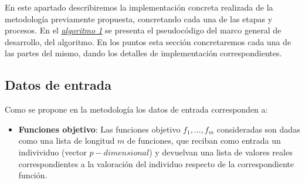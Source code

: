

\justify


En este apartado describiremos la implementación concreta realizada de la metodología previamente propuesta, concretando cada una de las etapas y procesos. En el \hyperref[alg:1]{\textit{algoritmo 1}} se presenta el pseudocódigo del marco general de desarrollo, del algoritmo. En los puntos esta sección concretaremos cada una de las partes del mismo, dando los detalles de implementación correspondientes.\\

\subsection{Datos de entrada}

Como se propone en la metodología los datos de entrada corresponden a:\\

\begin{itemize}
    \item \textbf{Funciones objetivo}: Las funciones objetivo $f_1, \dots, f_m$  consideradas son dadas como una lista de longitud $m$ de funciones, que reciban como entrada un indivividuo (vector $p-dimensional$) y devuelvan una lista de valores reales correspondientes a la valoración del individuo respecto de la correspondiente función.\\
\end{itemize}

